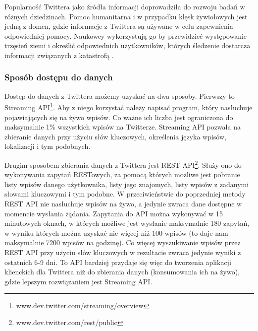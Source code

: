 Popularność Twittera jako źródła informacji doprowadziła do rozwoju badań
w różnych dziedzinach. Pomoc humanitarna i w przypadku klęsk żywiołowych
jest jedną z domen, gdzie informacje z Twittera są używane w celu zapewnienia
odpowiedniej pomocy. Naukowcy wykorzystują go by przewidzieć występowanie trzęsień
ziemi i określić odpowiednich użytkowników, których śledzenie dostarcza informacji
związanych z katastrofą \cite{TwitterDataAnalytics2013}.

\subsubsection{Sposób dostępu do danych}
Dostęp do danych z Twittera możemy uzyskać na dwa sposoby.
Pierwszy to Streaming API\footnote{www.dev.twitter.com/streaming/overview}.
Aby z niego korzystać należy napisać program, który nasłuchuje pojawiających się
na żywo wpisów. Co ważne ich liczba jest ograniczona do maksymalnie 1\% wszystkich
wpisów na Twitterze. Streaming API pozwala na zbieranie danych przy użyciu słów
kluczowych, określenia języka wpisów, lokalizacji i tym podobnych.

Drugim sposobem zbierania danych z Twittera jest REST 
API\footnote{www.dev.twitter.com/rest/public}. Służy ono do wykonywania
zapytań RESTowych, za pomocą których możliwe jest pobranie listy wpisów
danego użytkownika, listy jego znajomych, listy wpisów z zadanymi słowami
kluczowymi i tym podobne. W przeciwieństwie do poprzedniej metody REST API nie nasłuchuje
wpisów na żywo, a jedynie zwraca dane dostępne w momencie wysłania żądania.
Zapytania do API można wykonywać w 15 minutowych oknach, w których możliwe
jest wysłanie maksymalnie 180 zapytań, w wyniku których można uzyskać
nie więcej niż 100 wpisów (to daje nam maksymalnie 7200 wpisów na godzinę).
Co więcej wyszukiwanie wpisów przez REST API przy użyciu 
słów kluczowych w rezultacie zwraca jedynie wyniki z ostatnich
6-9 dni. 
To API bardziej przydaje się więc do tworzenia aplikacji
klienckich dla Twittera niż do zbierania danych (konsumowania ich na żywo),
gdzie lepszym rozwiązaniem jest Streaming API.



